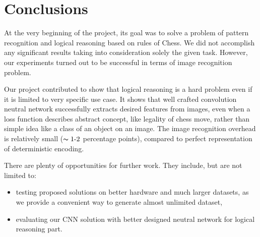 \documentclass[10pt,twocolumn,letterpaper]{article}
\begin{document}
\section{Conclusions}

At the very beginning of the project, its goal was to solve a problem of pattern
recognition and logical reasoning based on rules of Chess. We did not accomplish
any significant results taking into consideration solely the given task.
However, our experiments turned out to be successful in terms of image
recognition problem.

Our project contributed to show that logical reasoning is a hard problem even if
it is limited to very specific use case. It shows that well crafted convolution
neutral network successfully extracts desired features from images, even when a
loss function describes abstract concept, like legality of chess move, rather
than simple idea like a class of an object on an image. The image recognition
overhead is relatively small ($\thicksim 1 \text{-} 2$ percentage points),
compared to perfect representation of deterministic encoding.

There are plenty of opportunities for further work. They include, but are not
limited to:
\begin{itemize}
\item testing proposed solutions on better hardware and much larger datasets, as
we provide a convenient way to generate almost unlimited dataset,
\item evaluating our CNN solution with better designed neutral network for
logical reasoning part.
\end{itemize}

{\small


}
\end{document}

